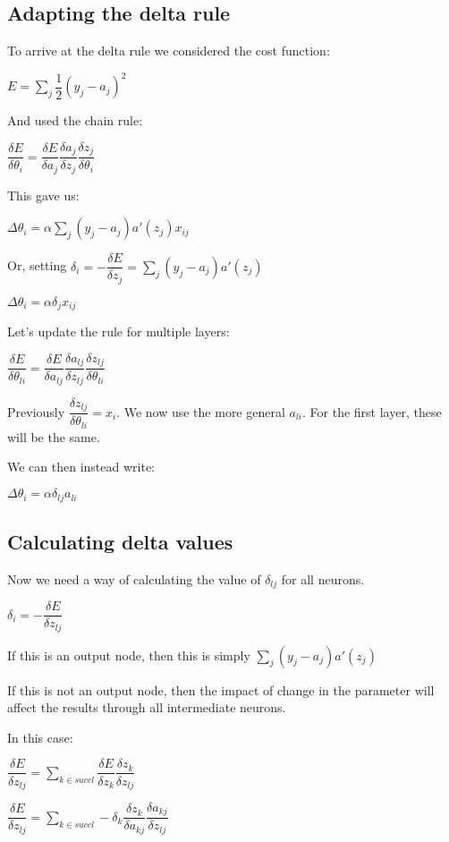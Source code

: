 
\subsection{Adapting the delta rule}

To arrive at the delta rule we considered the cost function:

\(E=\sum_j\dfrac{1}{2}(y_j-a_j)^2\)

And used the chain rule:

\(\dfrac{\delta E}{\delta \theta_i }=\dfrac{\delta E}{\delta a_j}\dfrac{\delta a_j}{\delta z_j}\dfrac{\delta z_j}{\delta \theta_i}\)

This gave us:

\(\Delta \theta_i=\alpha \sum_j(y_j-a_j)a'(z_j)x_{ij}\)

Or, setting \(\delta_i=-\dfrac{\delta E}{\delta z_j}=\sum_j(y_j-a_j)a'(z_j)\)

\(\Delta \theta_i=\alpha \delta_j x_{ij}\)

Let's update the rule for multiple layers:

\(\dfrac{\delta E}{\delta \theta_{li}}=\dfrac{\delta E}{\delta a_{lj}}\dfrac{\delta a_{lj}}{\delta z_{lj}}\dfrac{\delta z_{lj}}{\delta \theta_{li}}\)

Previously \(\dfrac{\delta z_{lj}}{\delta \theta_{li}}=x_i\). We now use the more general \(a_{li}\). For the first layer, these will be the same.

We can then instead write:

\(\Delta \theta_i=\alpha \delta_{lj} a_{li}\)

\subsection{Calculating delta values}

Now we need a way of calculating the value of \(\delta_{lj}\) for all neurons.

\(\delta_i=-\dfrac{\delta E}{\delta z_{lj}}\)

If this is an output node, then this is simply \(\sum_j(y_j-a_j)a'(z_j)\)

If this is not an output node, then the impact of change in the parameter will affect the results through all intermediate neurons.

In this case:

\(\dfrac{\delta E}{\delta z_{lj}}=\sum_{k\in succ{l}}\dfrac{\delta E}{\delta z_{k}}\dfrac{\delta z_{k}}{\delta z_{lj}}\)

\(\dfrac{\delta E}{\delta z_{lj}}=\sum_{k\in succ{l}}-\delta_{k}\dfrac{\delta z_{k}}{\delta a_{kj}}\dfrac{\delta a_{kj}}{\delta z_{lj}}\)


